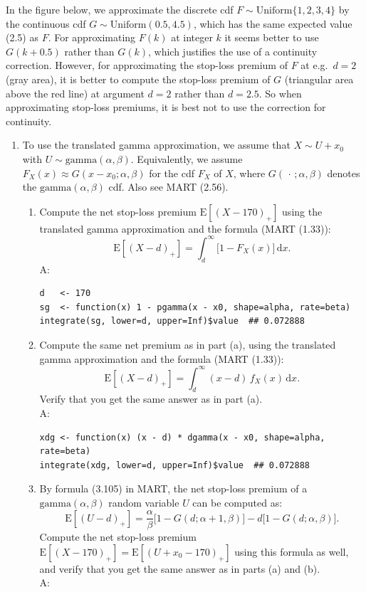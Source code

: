 \documentclass{article}
\begin{document}
In the figure below, we approximate the discrete cdf $F \sim \mathrm{Uniform}\{1,2,3,4\}$ by the continuous cdf $G \sim \mathrm{Uniform}(0.5, 4.5)$, which has the same expected value (2.5) as $F$. For approximating $F(k)$ at integer $k$ it seems better to use $G(k+0.5)$ rather than $G(k)$, which justifies the use of a continuity correction. However, for approximating the stop-loss premium of $F$ at e.g.\ $d = 2$ (gray area), it is better to compute the stop-loss premium of $G$ (triangular area above the red line) at argument $d = 2$ rather than $d = 2.5$. So when approximating stop-loss premiums, it is best not to use the correction for continuity.

\begin{enumerate}
  \item[$\boldsymbol{Q_6}$]
To use the translated gamma approximation, we assume that $X \sim U + x_0$ with $U \sim \mathrm{gamma}(\alpha, \beta)$. Equivalently, we assume $F_X(x) \approx G(x - x_0; \alpha, \beta)$ for the cdf $F_X$ of $X$, where $G(\,\cdot\,; \alpha, \beta)$ denotes the $\mathrm{gamma}(\alpha, \beta)$ cdf. Also see MART (2.56).
    \begin{enumerate}
      \item[(a)] Compute the net stop-loss premium $\mathrm{E}[(X-170)_+]$ using the translated gamma approximation and the formula (MART (1.33)):
      \[
        \mathrm{E}[(X-d)_+] = \int_d^{\infty} \bigl[1 - F_X(x)\bigr]\,\mathrm{d}x.
      \]
      A:

\begin{lstlisting}
d   <- 170
sg  <- function(x) 1 - pgamma(x - x0, shape=alpha, rate=beta)
integrate(sg, lower=d, upper=Inf)$value  ## 0.072888
\end{lstlisting}

      \item[(b)] Compute the same net premium as in part (a), using the translated gamma approximation and the formula (MART (1.33)):
      \[
        \mathrm{E}[(X-d)_+] = \int_d^{\infty} (x-d)\,f_X(x)\,\mathrm{d}x.
      \]
      Verify that you get the same answer as in part (a). \\A:
\begin{lstlisting}
xdg <- function(x) (x - d) * dgamma(x - x0, shape=alpha, rate=beta)
integrate(xdg, lower=d, upper=Inf)$value  ## 0.072888
\end{lstlisting}

      \item[(c)] By formula (3.105) in MART, the net stop-loss premium of a $\mathrm{gamma}(\alpha,\beta)$ random variable $U$ can be computed as:
      \[
        \mathrm{E}[(U-d)_+] = \frac{\alpha}{\beta}\bigl[1 - G(d;\alpha+1,\beta)\bigr] - d\bigl[1 - G(d;\alpha,\beta)\bigr].
      \]
      Compute the net stop-loss premium $\mathrm{E}[(X-170)_+] = \mathrm{E}[(U+x_0-170)_+]$ using this formula as well, and verify that you get the same answer as in parts (a) and (b). \\A:


\end{enumerate}
\end{enumerate}
\end{document}
